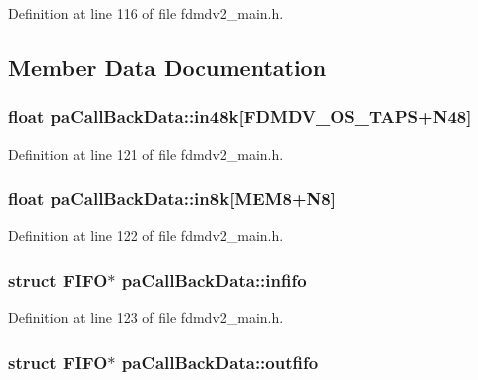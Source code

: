 Definition at line 116 of file fdmdv2\-\_\-main.\-h.



\subsection{Member Data Documentation}
\hypertarget{structpa_call_back_data_a2f3083066c414621a834d3af98aa26cf}{
\subsubsection[{in48k}]{\setlength{\rightskip}{0pt plus 5cm}float pa\-Call\-Back\-Data\-::in48k\mbox{[}F\-D\-M\-D\-V\-\_\-\-O\-S\-\_\-\-T\-A\-P\-S+{\bf N48}\mbox{]}}}\label{structpa_call_back_data_a2f3083066c414621a834d3af98aa26cf}


Definition at line 121 of file fdmdv2\-\_\-main.\-h.

\hypertarget{structpa_call_back_data_a1eaf4a649210c178b8671653b89e2141}{
\subsubsection[{in8k}]{\setlength{\rightskip}{0pt plus 5cm}float pa\-Call\-Back\-Data\-::in8k\mbox{[}{\bf M\-E\-M8}+{\bf N8}\mbox{]}}}\label{structpa_call_back_data_a1eaf4a649210c178b8671653b89e2141}


Definition at line 122 of file fdmdv2\-\_\-main.\-h.

\hypertarget{structpa_call_back_data_adce1a4d7f2654a49440799ca0c3e25e1}{
\subsubsection[{infifo}]{\setlength{\rightskip}{0pt plus 5cm}struct F\-I\-F\-O$\ast$ pa\-Call\-Back\-Data\-::infifo}}\label{structpa_call_back_data_adce1a4d7f2654a49440799ca0c3e25e1}


Definition at line 123 of file fdmdv2\-\_\-main.\-h.

\hypertarget{structpa_call_back_data_ab1114cd3fc9090e7cc89f6730481a890}{
\subsubsection[{outfifo}]{\setlength{\rightskip}{0pt plus 5cm}struct F\-I\-F\-O$\ast$ pa\-Call\-Back\-Data\-::outfifo}}\label{structpa_call_back_data_ab1114cd3fc9090e7cc89f6730481a890}


